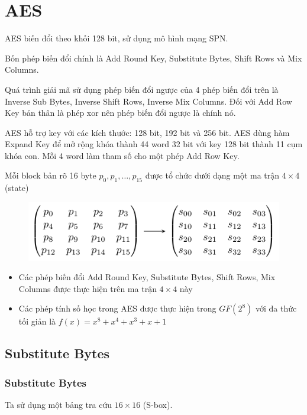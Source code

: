 \chapter{AES}

AES biến đổi theo khối 128 bit, sử dụng mô hình mạng SPN.

Bốn phép biến đổi chính là Add Round Key, Substitute Bytes, Shift Rows và Mix Columns.

Quá trình giải mã sử dụng phép biến đổi ngược của 4 phép biến đổi trên là Inverse Sub Bytes, Inverse Shift Rows, Inverse Mix Columns. Đối với Add Row Key bản thân là phép xor nên phép biến đổi ngược là chính nó.

AES hỗ trợ key với các kích thước: 128 bit, 192 bit và 256 bit. AES dùng hàm Expand Key để mở rộng khóa thành 44 word 32 bit với key 128 bit thành 11 cụm khóa con. Mỗi 4 word làm tham số cho một phép Add Row Key.

Mỗi block bản rõ 16 byte $p_0, p_1, \ldots, p_{15}$ được tổ chức dưới dạng một ma trận $4 \times 4$ (state)

\begin{figure}[ht]
    \centering
    \includegraphics{AES/state.pdf}
\end{figure}    

\begin{itemize}
    \item Các phép biến đổi Add Round Key, Substitute Bytes, Shift Rows, Mix Columns được thực hiện trên ma trận $4 \times 4$ này
    \item Các phép tính số học trong AES được thực hiện trong $GF(2^8)$ với đa thức tối giản là $f(x) = x^8 + x^4 + x^3 + x + 1$
\end{itemize}

\section{Substitute Bytes}

\subsection{Substitute Bytes}

Ta sử dụng một bảng tra cứu $16 \times 16$ (S-box).

